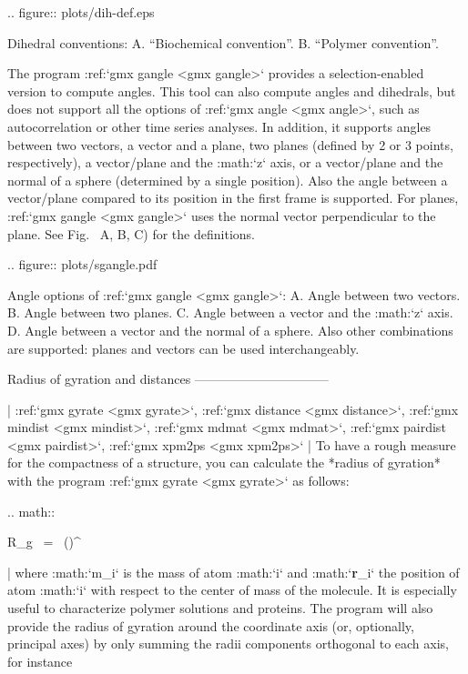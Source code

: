 .. figure:: plots/dih-def.eps

    Dihedral conventions: A. “Biochemical convention”. B. “Polymer
    convention”.

The program :ref:`gmx gangle <gmx gangle>`
provides a selection-enabled version to compute angles. This tool can
also compute angles and dihedrals, but does not support all the options
of :ref:`gmx angle <gmx angle>`, such as autocorrelation or other time
series analyses. In addition, it supports angles between two vectors, a
vector and a plane, two planes (defined by 2 or 3 points, respectively),
a vector/plane and the :math:`z` axis, or a vector/plane and the normal
of a sphere (determined by a single position). Also the angle between a
vector/plane compared to its position in the first frame is supported.
For planes, :ref:`gmx gangle <gmx gangle>`
uses the normal vector perpendicular to the plane. See
Fig. 
A, B, C) for the definitions.

.. figure:: plots/sgangle.pdf

    Angle options of :ref:`gmx gangle <gmx gangle>`: A. Angle between two
    vectors. B. Angle between two planes. C. Angle between a vector and the
    :math:`z` axis. D. Angle between a vector and the normal of a sphere.
    Also other combinations are supported: planes and vectors can be used
    interchangeably.

Radius of gyration and distances
--------------------------------

| :ref:`gmx gyrate <gmx gyrate>`, :ref:`gmx distance <gmx distance>`, 
  :ref:`gmx mindist <gmx mindist>`, :ref:`gmx mdmat <gmx mdmat>`,
  :ref:`gmx pairdist <gmx pairdist>`, :ref:`gmx xpm2ps <gmx xpm2ps>`
| To have a rough measure for the compactness of a structure, you can
  calculate the *radius of gyration* with the program
  :ref:`gmx gyrate <gmx gyrate>` as follows:

  .. math::

     R_g ~=~ \left({}\right)^{{}}
     \label{eqn:rg}

| where :math:`m_i` is the mass of atom :math:`i` and :math:`{\bf r}_i`
  the position of atom :math:`i` with respect to the center of mass of
  the molecule. It is especially useful to characterize polymer
  solutions and proteins. The program will also provide the radius of
  gyration around the coordinate axis (or, optionally, principal axes)
  by only summing the radii components orthogonal to each axis, for
  instance

